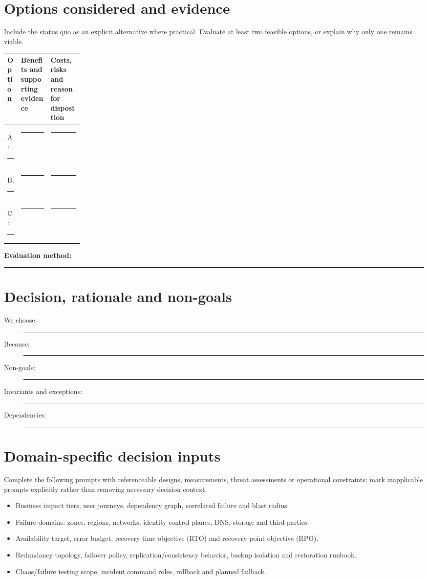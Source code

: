 \documentclass[11pt,letterpaper]{article}
\newcommand{\BlankResponse}{\rule[-0.4em]{0pt}{2em}\rule{0.65\linewidth}{0.4pt}}
\begin{document}
\section{Options considered and evidence}
Include the status quo as an explicit alternative where practical. Evaluate
at least two feasible options, or explain why only one remains viable.
\par\noindent\begin{tabularx}{\linewidth}{@{}>{\raggedright\arraybackslash}p{0.18\linewidth}>{\raggedright\arraybackslash}X >{\raggedright\arraybackslash}X@{}}
\toprule
\textbf{Option} & \textbf{Benefits and supporting evidence} & \textbf{Costs, risks and reason for disposition}\\
\midrule
A: \BlankResponse & \BlankResponse & \BlankResponse\\
B: \BlankResponse & \BlankResponse & \BlankResponse\\
C: \BlankResponse & \BlankResponse & \BlankResponse\\
\bottomrule
\end{tabularx}\par

\noindent\textbf{Evaluation method:} \BlankResponse

\section{Decision, rationale and non-goals}
\begin{description}
\item[We choose:] \BlankResponse
\item[Because:] \BlankResponse
\item[Non-goals:] \BlankResponse
\item[Invariants and exceptions:] \BlankResponse
\item[Dependencies:] \BlankResponse
\end{description}

\section{Domain-specific decision inputs}
Complete the following prompts with referenceable designs, measurements,
threat assessments or operational constraints; mark inapplicable prompts
explicitly rather than removing necessary decision context.
\begin{itemize}
\item Business impact tiers, user journeys, dependency graph, correlated failure and blast radius.
\item Failure domains: zones, regions, networks, identity control planes, DNS, storage and third parties.
\item Availability target, error budget, recovery time objective (RTO) and recovery point objective (RPO).
\item Redundancy topology, failover policy, replication/consistency behavior, backup isolation and restoration runbook.
\item Chaos/failure testing scope, incident command roles, rollback and planned failback.
\end{itemize}
\end{document}
